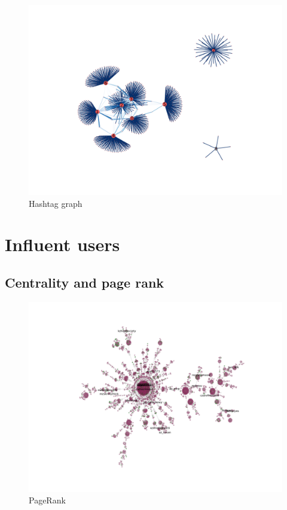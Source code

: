 \documentclass[a4paper,12pt]{report}
\begin{document}
\begin{figure}[H]
\centering
\includegraphics[width=\textwidth]{images/graphs/users/13_08.png}
\caption{Hashtag graph}
\end{figure}

\newpage
\section{Influent users}
\subsection{Centrality and page rank}
\begin{figure}[H]
\centering
\includegraphics[width=\textwidth]{images/graphs/rtmentions/rtmentions_11_08_02_09.png}
\caption{PageRank}
\end{figure}
\end{document}
